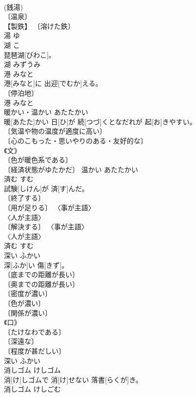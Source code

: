 \documentclass[8pt]{extreport}
\begin{document}
\begin{CJK}{UTF8}{min}
\\	(銭湯) 
\\	〔温泉〕 
\\	【製鉄】 〔溶けた鉄〕 
\\	湯	ゆ	
\\	湖	こ	
\\	琵琶湖[びわこ]。	
\\	[＝こすい１]	湖	みずうみ	
\\	港	みなと	
\\	港[みなと]に 出迎[でむか]える。	
\\	〔停泊地〕 
\\	港	みなと	
\\	暖かい・温かい	あたたかい	
\\	暖[あたた]かい 日[ひ]が 続[つづ]くとなだれが 起[お]きやすい。	
\\	〔気温や物の温度が適度に高い〕 
\\	〔心のこもった・思いやりのある・友好的な〕 
\\	《文》 
\\	〔色が暖色系である〕 
\\	〔経済状態がゆたかだ〕	温かい	あたたかい	
\\	済む	すむ	
\\	試験[しけん]が 済[す]んだ。	
\\	〔終了する〕 
\\	〔用が足りる〕 〈事が主語〉 
\\	〈人が主語〉 
\\	〔解決する〕 〈事が主語〉 
\\	〈人が主語〉 
\\	済む	すむ	
\\	深い	ふかい	
\\	深[ふか]い 傷[きず]。	
\\	〔底までの距離が長い〕 
\\	〔奥までの距離が長い〕 
\\	〔密度が濃い〕 
\\	〔色が濃い〕 
\\	〔関係が濃い〕 
\\	《口》 
\\	〔たけなわである〕 
\\	〔深遠な〕 
\\	〔程度が甚だしい〕 
\\	深い	ふかい	
\\	消しゴム	けしゴム	
\\	消[け]しゴムで 消[け]せない 落書[らくが]き。	
\\	消しゴム	けしごむ	

\end{CJK}
\end{document}
